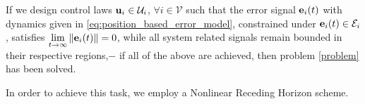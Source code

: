 If we design control laws $\bm{\mathbf{u}}_i \in \mathcal{U}_i$,
$\forall i \in \mathcal{V}$ such that the error signal $\bm{\mathbf{e}}_i(t)$ with
dynamics given in \eqref{eq:position_based_error_model}, constrained under
$\bm{\mathbf{e}}_i(t) \in \mathcal{E}_i$, satisfies
$\lim\limits_{t \to \infty} \|\bm{\mathbf{e}}_i(t)\| = 0$, while all system related
signals remain bounded in their respective regions,$-$ if all of the above are
achieved, then problem \eqref{problem} has been solved.

In order to achieve this task, we employ a Nonlinear Receding Horizon scheme.
